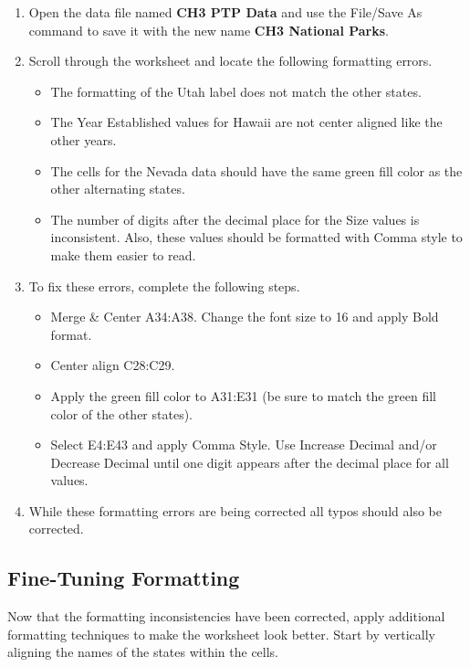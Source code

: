 \begin{enumerate}
	\item Open the data file named \textbf{CH3 PTP Data} and use the File/Save As command to save it with the new name \textbf{CH3 National Parks}.
	\item Scroll through the worksheet and locate the following formatting errors.

	\begin{itemize}
		\item The formatting of the Utah label does not match the other states.
		\item The Year Established values for Hawaii are not center aligned like the other years.
		\item The cells for the Nevada data should have the same green fill color as the other alternating states.
		\item The number of digits after the decimal place for the Size values is inconsistent. Also, these values should be formatted with Comma style to make them easier to read.
	\end{itemize}

		\item To fix these errors, complete the following steps.

	\begin{itemize}
		\item Merge \& Center \textsf{A34:A38}. Change the font size to 16 and apply Bold format.
		\item Center align \textsf{C28:C29}.
		\item Apply the green fill color to \textsf{A31:E31} (be sure to match the green fill color of the other states).
		\item Select \textsf{E4:E43} and apply Comma Style. Use Increase Decimal and/or Decrease Decimal until one digit appears after the decimal place for all values.
	\end{itemize}
	
	\item While these formatting errors are being corrected all typos should also be corrected.
\end{enumerate}

\subsection{Fine-Tuning Formatting}

Now that the formatting inconsistencies have been corrected, apply additional formatting techniques to make the worksheet look better. Start by vertically aligning the names of the states within the cells.

